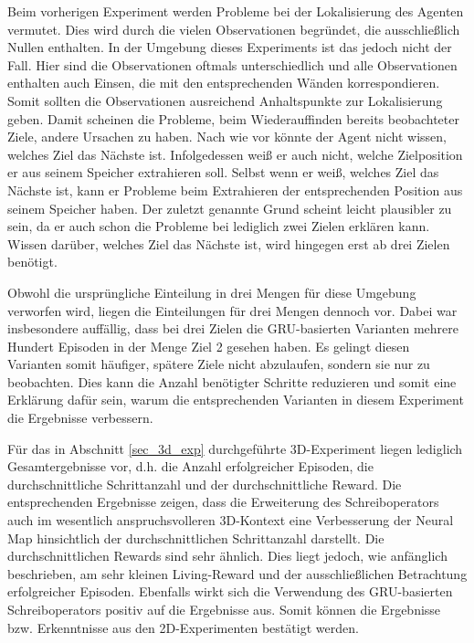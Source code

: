 Beim vorherigen Experiment werden Probleme bei der Lokalisierung des Agenten vermutet. Dies wird durch die vielen Observationen begründet, die ausschließlich Nullen enthalten. In der Umgebung dieses Experiments ist das jedoch nicht der Fall. Hier sind die Observationen oftmals unterschiedlich und alle Observationen enthalten auch Einsen, die mit den entsprechenden Wänden korrespondieren. Somit sollten die Observationen ausreichend Anhaltspunkte zur Lokalisierung geben. Damit scheinen die Probleme, beim Wiederauffinden bereits beobachteter Ziele, 
andere Ursachen zu haben. Nach wie vor könnte der Agent nicht wissen, welches Ziel das Nächste ist. Infolgedessen weiß er auch nicht, welche Zielposition er aus seinem Speicher extrahieren soll. Selbst wenn er weiß, welches Ziel das Nächste ist, kann er Probleme beim Extrahieren der entsprechenden Position aus seinem Speicher haben. Der zuletzt genannte Grund scheint leicht plausibler zu sein, da er auch schon die Probleme bei lediglich zwei Zielen erklären kann. Wissen darüber, welches Ziel das Nächste ist, wird hingegen erst ab drei Zielen benötigt.

Obwohl die ursprüngliche Einteilung in drei Mengen für diese Umgebung verworfen wird, liegen die Einteilungen für drei Mengen dennoch vor. Dabei war insbesondere auffällig, dass bei drei Zielen die GRU-basierten Varianten mehrere Hundert Episoden in der Menge \glqq Ziel 2 gesehen\grqq{} haben. Es gelingt diesen Varianten somit häufiger, spätere Ziele nicht abzulaufen, sondern sie nur zu beobachten. Dies kann die Anzahl benötigter Schritte reduzieren und somit eine Erklärung dafür sein, warum die entsprechenden Varianten in diesem Experiment die Ergebnisse verbessern.

Für das in Abschnitt \ref{sec_3d_exp} durchgeführte 3D-Experiment liegen lediglich Gesamtergebnisse vor, d.h. die Anzahl erfolgreicher Episoden, die durchschnittliche Schrittanzahl und der durchschnittliche Reward. Die entsprechenden Ergebnisse zeigen, dass die Erweiterung des Schreiboperators auch im wesentlich anspruchsvolleren 3D-Kontext eine Verbesserung der Neural Map hinsichtlich der durchschnittlichen Schrittanzahl darstellt. Die durchschnittlichen Rewards sind sehr ähnlich. Dies liegt jedoch, wie anfänglich beschrieben, am sehr kleinen Living-Reward und der ausschließlichen Betrachtung erfolgreicher Episoden. Ebenfalls wirkt sich die Verwendung des GRU-basierten Schreiboperators positiv auf die Ergebnisse aus. Somit können die Ergebnisse bzw. Erkenntnisse aus den 2D-Experimenten bestätigt werden.

